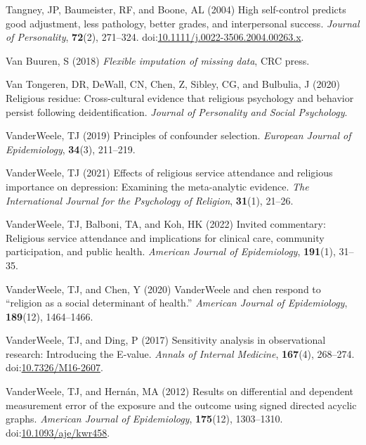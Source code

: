 \documentclass[
  single column]{article}
\newlength{\cslhangindent}
\newenvironment{CSLReferences}[2] %
 {\begin{list}{}{%
  \setlength{\itemindent}{0pt}
  \setlength{\leftmargin}{0pt}
  \setlength{\parsep}{0pt}
  \ifodd #1
   \setlength{\leftmargin}{\cslhangindent}
   \setlength{\itemindent}{-1\cslhangindent}
  \fi
  \setlength{\itemsep}{#2\baselineskip}}}
 {\end{list}}
\begin{document}
\begin{CSLReferences}{1}{0}
Tangney, JP, Baumeister, RF, and Boone, AL (2004) High self-control
predicts good adjustment, less pathology, better grades, and
interpersonal success. \emph{Journal of Personality}, \textbf{72}(2),
271--324.
doi:\href{https://doi.org/10.1111/j.0022-3506.2004.00263.x}{10.1111/j.0022-3506.2004.00263.x}.

Van Buuren, S (2018) \emph{Flexible imputation of missing data}, CRC
press.

Van Tongeren, DR, DeWall, CN, Chen, Z, Sibley, CG, and Bulbulia, J
(2020) Religious residue: Cross-cultural evidence that religious
psychology and behavior persist following deidentification.
\emph{Journal of Personality and Social Psychology}.

VanderWeele, TJ (2019) Principles of confounder selection.
\emph{European Journal of Epidemiology}, \textbf{34}(3), 211--219.

VanderWeele, TJ (2021) Effects of religious service attendance and
religious importance on depression: Examining the meta-analytic
evidence. \emph{The International Journal for the Psychology of
Religion}, \textbf{31}(1), 21--26.

VanderWeele, TJ, Balboni, TA, and Koh, HK (2022) Invited commentary:
Religious service attendance and implications for clinical care,
community participation, and public health. \emph{American Journal of
Epidemiology}, \textbf{191}(1), 31--35.

VanderWeele, TJ, and Chen, Y (2020) VanderWeele and chen respond to
{``religion as a social determinant of health.''} \emph{American Journal
of Epidemiology}, \textbf{189}(12), 1464--1466.

VanderWeele, TJ, and Ding, P (2017) Sensitivity analysis in
observational research: Introducing the {E}-value. \emph{Annals of
Internal Medicine}, \textbf{167}(4), 268--274.
doi:\href{https://doi.org/10.7326/M16-2607}{10.7326/M16-2607}.

VanderWeele, TJ, and Hernán, MA (2012) Results on differential and
dependent measurement error of the exposure and the outcome using signed
directed acyclic graphs. \emph{American Journal of Epidemiology},
\textbf{175}(12), 1303--1310.
doi:\href{https://doi.org/10.1093/aje/kwr458}{10.1093/aje/kwr458}.


\end{CSLReferences}
\end{document}
